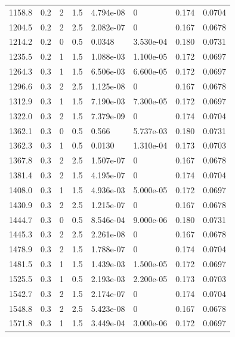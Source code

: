 \documentclass[preview]{standalone}
\begin{document}
{{{\begin{tabular}{L{1.2cm}C{1.2cm} C{0.3cm}C{0.5cm} C{1.4cm}C{1.4cm} C{1.4cm}C{1.4cm}}
  1158.8  &   0.2  & 2     & 1.5 &  4.794e-08  & 0  & 0.174 &  0.0704   \\ 
  1204.5  &   0.2  & 2     & 2.5 &  2.082e-07  & 0  & 0.167 &  0.0678   \\ 
  1214.2  &   0.2  & 0     & 0.5 &  0.0348  & 3.530e-04  & 0.180 &  0.0731   \\ 
  1235.5  &   0.2  & 1     & 1.5 &  1.088e-03  & 1.100e-05  & 0.172 &  0.0697   \\ 
  1264.3  &   0.3  & 1     & 1.5 &  6.506e-03  & 6.600e-05  & 0.172 &  0.0697   \\ 
  1296.6  &   0.3  & 2     & 2.5 &  1.125e-08  & 0  & 0.167 &  0.0678   \\ 
  1312.9  &   0.3  & 1     & 1.5 &  7.190e-03  & 7.300e-05  & 0.172 &  0.0697   \\ 
  1322.0  &   0.3  & 2     & 1.5 &  7.379e-09  & 0  & 0.174 &  0.0704   \\ 
  1362.1  &   0.3  & 0     & 0.5 &  0.566  & 5.737e-03  & 0.180 &  0.0731   \\ 
  1362.3  &   0.3  & 1     & 0.5 &  0.0130  & 1.310e-04  & 0.173 &  0.0703   \\ 
  1367.8  &   0.3  & 2     & 2.5 &  1.507e-07  & 0  & 0.167 &  0.0678   \\ 
  1381.4  &   0.3  & 2     & 1.5 &  4.195e-07  & 0  & 0.174 &  0.0704   \\ 
  1408.0  &   0.3  & 1     & 1.5 &  4.936e-03  & 5.000e-05  & 0.172 &  0.0697   \\ 
  1430.9  &   0.3  & 2     & 2.5 &  1.215e-07  & 0  & 0.167 &  0.0678   \\ 
  1444.7  &   0.3  & 0     & 0.5 &  8.546e-04  & 9.000e-06  & 0.180 &  0.0731   \\ 
  1445.3  &   0.3  & 2     & 2.5 &  2.261e-08  & 0  & 0.167 &  0.0678   \\ 
  1478.9  &   0.3  & 2     & 1.5 &  1.788e-07  & 0  & 0.174 &  0.0704   \\ 
  1481.5  &   0.3  & 1     & 1.5 &  1.439e-03  & 1.500e-05  & 0.172 &  0.0697   \\ 
  1525.5  &   0.3  & 1     & 0.5 &  2.193e-03  & 2.200e-05  & 0.173 &  0.0703   \\ 
  1542.7  &   0.3  & 2     & 1.5 &  2.174e-07  & 0  & 0.174 &  0.0704   \\ 
  1548.8  &   0.3  & 2     & 2.5 &  5.423e-08  & 0  & 0.167 &  0.0678   \\ 
  1571.8  &   0.3  & 1     & 1.5 &  3.449e-04  & 3.000e-06  & 0.172 &  0.0697   \\ 

\end{tabular}}}}
\end{document}
